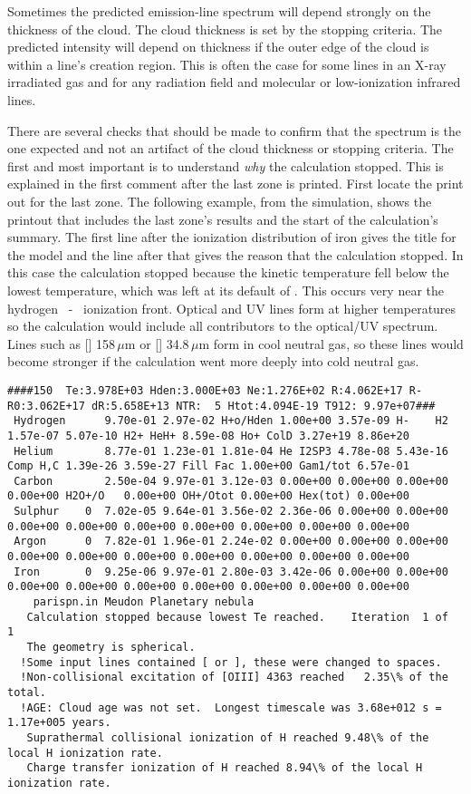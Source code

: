 Sometimes the predicted emission-line spectrum will depend strongly on
the thickness of the cloud.
The cloud thickness is set by the stopping
criteria.
The predicted intensity will depend on thickness if the outer
edge of the cloud is within a line's creation region.
This is often the
case for some lines in an X-ray irradiated gas and for any radiation field
and molecular or low-ionization infrared lines.

There are several checks that should be made to confirm that the spectrum
is the one expected and not an artifact of the cloud thickness or stopping
criteria.
The first and most important is to understand \emph{why} the calculation
stopped.
This is explained in the first comment after the last zone is
printed.
First locate the print out for the last zone.
The following
example, from the  simulation, shows the printout that includes
the last zone's results and the start of the calculation's summary.
The
first line after the ionization distribution of iron gives the title for
the model and the line after that gives the reason that the calculation
stopped.
In this case the calculation stopped because the kinetic
temperature fell below the lowest temperature, which was left at its
default of \TEMPSTOPDEFAULT.
This occurs very near the hydrogen \hplus\ - \hO\ ionization front.
Optical and UV lines form at higher temperatures so the calculation would
include all contributors to the optical/UV spectrum.
Lines such as [\cii]
158\,$\mu$m or [] 34.8\,$\mu$m form in cool neutral gas,
so these lines would become
stronger if the calculation went more deeply into cold neutral gas.

{\setverbatimfontsize{\tiny}
\begin{verbatim}
####150  Te:3.978E+03 Hden:3.000E+03 Ne:1.276E+02 R:4.062E+17 R-R0:3.062E+17 dR:5.658E+13 NTR:  5 Htot:4.094E-19 T912: 9.97e+07###
 Hydrogen      9.70e-01 2.97e-02 H+o/Hden 1.00e+00 3.57e-09 H-    H2 1.57e-07 5.07e-10 H2+ HeH+ 8.59e-08 Ho+ ColD 3.27e+19 8.86e+20
 Helium        8.77e-01 1.23e-01 1.81e-04 He I2SP3 4.78e-08 5.43e-16 Comp H,C 1.39e-26 3.59e-27 Fill Fac 1.00e+00 Gam1/tot 6.57e-01
 Carbon        2.50e-04 9.97e-01 3.12e-03 0.00e+00 0.00e+00 0.00e+00 0.00e+00 H2O+/O   0.00e+00 OH+/Otot 0.00e+00 Hex(tot) 0.00e+00
 Sulphur    0  7.02e-05 9.64e-01 3.56e-02 2.36e-06 0.00e+00 0.00e+00 0.00e+00 0.00e+00 0.00e+00 0.00e+00 0.00e+00 0.00e+00 0.00e+00
 Argon      0  7.82e-01 1.96e-01 2.24e-02 0.00e+00 0.00e+00 0.00e+00 0.00e+00 0.00e+00 0.00e+00 0.00e+00 0.00e+00 0.00e+00 0.00e+00
 Iron       0  9.25e-06 9.97e-01 2.80e-03 3.42e-06 0.00e+00 0.00e+00 0.00e+00 0.00e+00 0.00e+00 0.00e+00 0.00e+00 0.00e+00 0.00e+00
    parispn.in Meudon Planetary nebula
   Calculation stopped because lowest Te reached.    Iteration  1 of  1
   The geometry is spherical.
  !Some input lines contained [ or ], these were changed to spaces.
  !Non-collisional excitation of [OIII] 4363 reached   2.35\% of the total.
  !AGE: Cloud age was not set.  Longest timescale was 3.68e+012 s = 1.17e+005 years.
   Suprathermal collisional ionization of H reached 9.48\% of the local H ionization rate.
   Charge transfer ionization of H reached 8.94\% of the local H ionization rate.
\end{verbatim}
}

